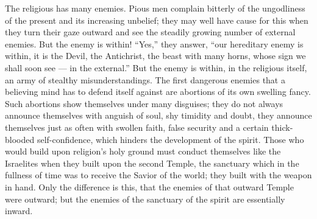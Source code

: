 \documentclass[12pt,a4paper,openany]{book}
\begin{document}
The religious has many enemies. Pious men
complain bitterly of the ungodliness of the present and its increasing
unbelief; they may well have cause for this when they turn their gaze outward
and see the steadily growing number of external enemies. But
the enemy is within! ``Yes,'' they answer, ``our hereditary enemy
is within, it is the Devil, the Antichrist, the beast
with many horns, whose sign we shall soon see --- in
the external.'' But the enemy is within, in the religious
itself, an army of stealthy misunderstandings. The first
dangerous enemies that a believing mind has to defend itself against
are abortions of its own swelling fancy. Such
abortions show themselves under many disguises; they do not
always announce themselves with anguish of soul, shy timidity and doubt, they
announce themselves just as often with swollen faith, false security
and a certain thick-blooded self-confidence, which hinders the
development of the spirit. Those who would build upon religion's holy
ground must conduct themselves like the Israelites when they built
upon the second Temple, the sanctuary which in the fullness of time
was to receive the Savior of the world; they built with the weapon
in hand. Only the difference is this, that the enemies of that
outward Temple were outward; but the enemies of the sanctuary
of the spirit are essentially inward.
\end{document}

